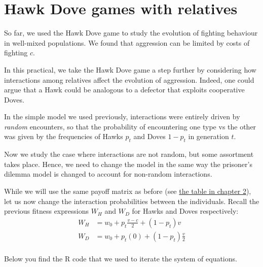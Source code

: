 \documentclass[
]{book}
\begin{document}
\hypertarget{hawk-dove-games-with-relatives}{%
\chapter{Hawk Dove games with relatives}\label{hawk-dove-games-with-relatives}}

So far, we used the Hawk Dove game to study the evolution of fighting behaviour in well-mixed populations. We found that aggression can be limited by costs of fighting \(c\).

In this practical, we take the Hawk Dove game a step further by considering how interactions among relatives affect the evolution of aggression. Indeed, one could argue that a Hawk could be analogous to a defector that exploits cooperative Doves.

In the simple model we used previously, interactions were entirely driven by \emph{random} encounters, so that the probability of encountering one type vs the other was given by the frequencies of Hawks \(p_{t}\) and Doves \(1-p_{t}\) in generation \(t\).

Now we study the case where interactions are not random, but some assortment takes place. Hence, we need to change the model in the same way the prisoner's dilemma model is changed to account for non-random interactions.

While we will use the same payoff matrix as before (see \protect\hyperlink{tab:payoffHD}{the table in chapter 2}), let us now change the interaction probabilities between the individuals. Recall the previous fitness expressions \(W_{H}\) and \(W_{D}\) for Hawks and Doves respectively:
\begin{align}
W_{H} &= w_{0} + p_{t} \frac{v-c}{2} + \left(1 - p_{t} \right) v \label{eq:wH} \\
W_{D} &= w_{0} + p_{t} (0) + \left(1 - p_{t} \right) \frac{v}{2} \label{eq:wD}\\
\end{align}

Below you find the R code that we used to iterate the system of equations.
\end{document}
